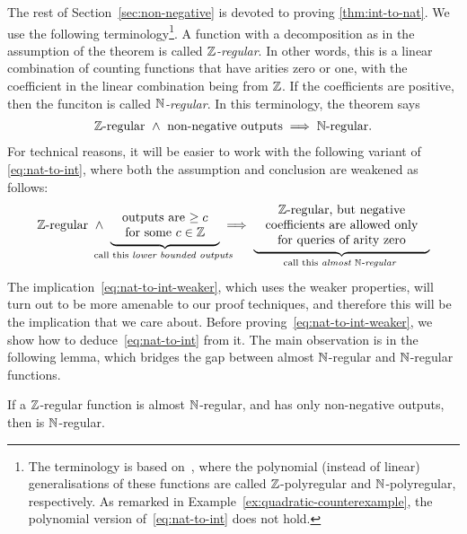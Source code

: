The rest of Section~\ref{sec:non-negative} is devoted to proving \cref{thm:int-to-nat}. We use the following terminology\footnote{The terminology is based on~\cite{Zpolyreg23}, where the polynomial (instead of linear) generalisations of these functions are called ${\mathbb Z}$-polyregular and ${\mathbb N}$-polyregular, respectively. As remarked in Example~\ref{ex:quadratic-counterexample}, the polynomial version of~\eqref{eq:nat-to-int} does not hold.
}. A function with a decomposition as in the assumption of the theorem is called \emph{${\mathbb Z}$-regular}. In other words, this is a linear combination of \mso counting functions that have arities zero or one, with the coefficient in the linear combination being from ${\mathbb Z}$. If the coefficients are positive, then the funciton is called \emph{${\mathbb N}$-regular}. In this terminology, the theorem says 
\begin{align}\label{eq:nat-to-int}
\text{${\mathbb Z}$-regular} \ \land \ \text{non-negative outputs} \implies \text{${\mathbb N}$-regular}.
\end{align}
For technical reasons, it will be easier to work with the following variant of \eqref{eq:nat-to-int}, where both the assumption and conclusion are weakened as follows: 
\begin{align}\label{eq:nat-to-int-weaker}
\text{$\Int$-regular} \ \land \ 
\myunderbrace{\text{
\begin{tabular}{c}
        outputs are $\ge c$ \\ 
        for some $c \in \Int$
    \end{tabular}
}}{call this \emph{lower bounded outputs}}
 \implies 
 \myunderbrace{\text{
\begin{tabular}{c}
         $\Int$-regular, but  negative \\ coefficients are allowed 
        only\\ for queries of arity zero
    \end{tabular}
}}{call this \emph{almost $\Nat$-regular}}
\end{align}
The implication~\eqref{eq:nat-to-int-weaker}, which uses the weaker properties, will turn out to be more amenable to our proof techniques, and therefore this will be the implication that we care about.  Before proving~\eqref{eq:nat-to-int-weaker}, we show how to deduce~\eqref{eq:nat-to-int} from it. The main observation is in the following lemma, which bridges the gap between almost ${\mathbb N}$-regular and ${\mathbb N}$-regular functions.



        \begin{lemma}\label{lem:remove-almost}
            If a  ${\mathbb Z}$-regular function  is almost ${\mathbb N}$-regular, and has only non-negative outputs, then  is ${\mathbb N}$-regular.
    \end{lemma}

